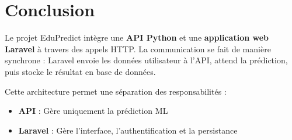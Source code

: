 \documentclass[12pt,a4paper]{article}
\begin{document}
\section{Conclusion}

Le projet EduPredict intègre une \textbf{API Python} et une \textbf{application web Laravel} à travers des appels HTTP. La communication se fait de manière synchrone : Laravel envoie les données utilisateur à l'API, attend la prédiction, puis stocke le résultat en base de données.

Cette architecture permet une séparation des responsabilités :
\begin{itemize}
    \item \textbf{API} : Gère uniquement la prédiction ML
    \item \textbf{Laravel} : Gère l'interface, l'authentification et la persistance
\end{itemize}
\end{document}

